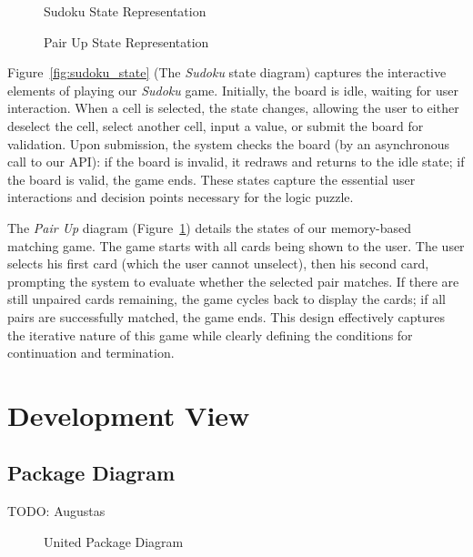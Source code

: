 \documentclass[11pt,a4paper]{article}
\newcommand{\inputdiagram}[1]{}
\newcommand{\textwidthdiagram}[2][1]{%
  \resizebox{#1\textwidth}{!}{\inputdiagram{#2}}%
}
\begin{document}
\begin{figure}[H]
    \centering
    \begin{minipage}[b]{0.48\textwidth}
        \centering
        \textwidthdiagram{sudoku_state.tex}
        \caption{Sudoku State Representation}
        \label{fig:sudoku_state}
    \end{minipage}
    \hfil
    \begin{minipage}[b]{0.48\textwidth}
        \centering
        \textwidthdiagram{pair_up_state.tex}
        \caption{Pair Up State Representation}
        \label{fig:pair_up_state}
    \end{minipage}
\end{figure}

Figure~\ref{fig:sudoku_state} (The \textit{Sudoku} state diagram) captures
the interactive elements of playing our \textit{Sudoku} game. Initially, the board
is idle, waiting for user interaction. When a cell is selected, the state
changes, allowing the user to either deselect the cell, select another
cell, input a value, or submit the board for validation. Upon submission,
the system checks the board (by an asynchronous call to our API): if the
board is invalid, it redraws and returns to the idle state; if the board
is valid, the game ends. These states capture the essential user interactions
and decision points necessary for the logic puzzle.

The \textit{Pair Up} diagram (Figure~\ref{fig:pair_up_state}) details the
states of our memory-based matching game. The game starts with all cards being
shown to the user. The user selects his first card (which the user cannot
unselect), then his second card, prompting the system to evaluate whether the
selected pair matches. If there are still unpaired cards remaining, the game cycles
back to display the cards; if all pairs are successfully matched,
the game ends. This design effectively captures the iterative nature of this
game while clearly defining the conditions for continuation and termination.

\section{Development View}

\subsection{Package Diagram}
TODO: Augustas
\begin{figure}[H]
    \centering
    \textwidthdiagram{united_package.latex}
    \caption{United Package Diagram}
    \label{fig:united_package}
\end{figure}
\end{document}
